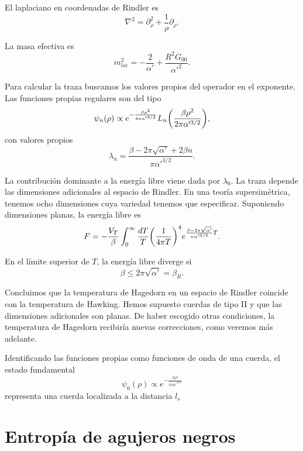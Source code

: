 El laplaciano en coordenadas de Rindler es
\begin{equation}
  \nabla^2  = \partial_\rho^2 + \frac{1}{\rho}\partial_\rho.
\end{equation}

La masa efectiva es 
\begin{equation}
  m_{loc}^2=-\frac{2}{\alpha'}+\frac{R^2G_{00}}{\alpha'^2}.
\end{equation}


Para calcular la traza buscamos los valores propios del operador en el exponente.
Las funciones propias regulares son del tipo
\begin{equation}
  \psi_n(\rho)\propto e^{-\frac{\beta \rho^2}{4\pi\alpha'^{3/2}} }
  L_n\qty(\frac{\beta\rho^2}{2\pi\alpha'^{3/2}}),
\end{equation}
con valores propios
\begin{equation}
  \lambda_n=\frac{\beta-2\pi\sqrt{\alpha'}+2\beta n }{\pi\alpha'^{3/2}}.
\end{equation}

La contribución dominante a la energía libre viene dada por $\lambda_0$.
La traza depende las dimensiones adicionales al espacio de Rindler. 
En una teoría supersimétrica, tenemos ocho dimensiones cuya variedad tenemos que especificar.
Suponiendo dimensiones planas, la energía libre es
\begin{equation}
  F= -\frac{V_T}{\beta}\int_0^\infty \frac{dT}{T}\qty(\frac{1}{4\pi T})^4 e^{\frac{\beta-2\pi\sqrt{\alpha'}}{\pi\alpha'^{3/2}}T}.
\end{equation}

En el límite superior de $T$, la energía libre diverge si
\begin{equation}
  \beta \leq 2\pi\sqrt{\alpha'}=\beta_R.
\end{equation}

Concluimos que la temperatura de Hagedorn en un espacio de Rindler coincide con la temperatura
de Hawking.
Hemos supuesto cuerdas de tipo II y que las dimensiones adicionales son planas.
De haber escogido otras condiciones, la temperatura de Hagedorn recibiría nuevas correcciones,
como veremos más adelante.

Identificando las funciones propias como funciones de onda de una cuerda, el estado fundamental
\begin{equation}
  \psi_0(\rho)\propto e^{-\frac{\beta \rho^2}{4\pi\alpha'^{3/2}} }
\end{equation}
representa una cuerda localizada a la distancia $l_s$




\section{Entropía de agujeros negros}
